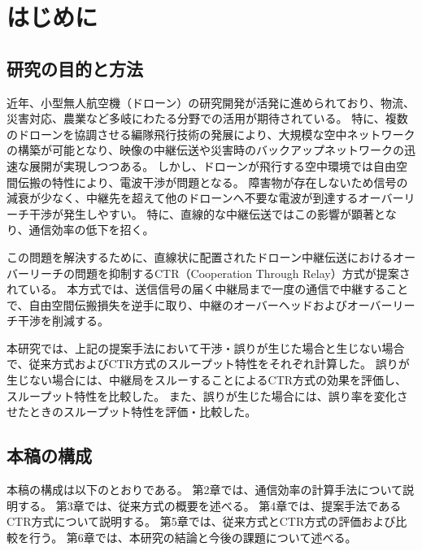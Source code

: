 \documentclass[a4paper,10.5pt]{ltjsarticle}
\begin{document}

\tableofcontents
\thispagestyle{empty}



\clearpage
\setcounter{page}{1}
\section{はじめに}

\subsection{研究の目的と方法}

近年、小型無人航空機（ドローン）の研究開発が活発に進められており、物流、災害対応、農業など多岐にわたる分野での活用が期待されている。
特に、複数のドローンを協調させる編隊飛行技術の発展により、大規模な空中ネットワークの構築が可能となり、映像の中継伝送や災害時のバックアップネットワークの迅速な展開が実現しつつある。
しかし、ドローンが飛行する空中環境では自由空間伝搬の特性により、電波干渉が問題となる。
障害物が存在しないため信号の減衰が少なく、中継先を超えて他のドローンへ不要な電波が到達するオーバーリーチ干渉が発生しやすい。
特に、直線的な中継伝送ではこの影響が顕著となり、通信効率の低下を招く。

この問題を解決するために、直線状に配置されたドローン中継伝送におけるオーバーリーチの問題を抑制するCTR（Cooperation Through Relay）方式が提案されている。
本方式では、送信信号の届く中継局まで一度の通信で中継することで、自由空間伝搬損失を逆手に取り、中継のオーバーヘッドおよびオーバーリーチ干渉を削減する。

本研究では、上記の提案手法において干渉・誤りが生じた場合と生じない場合で、従来方式およびCTR方式のスループット特性をそれぞれ計算した。
誤りが生じない場合には、中継局をスルーすることによるCTR方式の効果を評価し、スループット特性を比較した。
また、誤りが生じた場合には、誤り率を変化させたときのスループット特性を評価・比較した。



\subsection{本稿の構成}
本稿の構成は以下のとおりである。
第2章では、通信効率の計算手法について説明する。
第3章では、従来方式の概要を述べる。
第4章では、提案手法であるCTR方式について説明する。
第5章では、従来方式とCTR方式の評価および比較を行う。
第6章では、本研究の結論と今後の課題について述べる。
\clearpage
\end{document}
